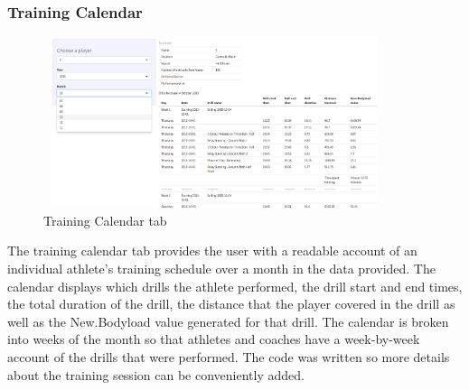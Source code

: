 \subsubsection{Training Calendar}
\begin{figure}
	\vspace{-2em}
	\includegraphics[height=5cm, width=10cm]{Images/TrainingCalendarTab.png}
	\caption{Training Calendar tab}
\end{figure}
The training calendar tab provides the user with a readable account of an individual athlete's training schedule over a month in the data provided. The calendar displays which drills the athlete performed, the drill start and end times, the total duration of the drill, the distance that the player covered in the drill as well as the New.Bodyload value generated for that drill. The calendar is broken into weeks of the month so that athletes and coaches have a week-by-week account of the drills that were performed. The code was written so more details about the training session can be conveniently added.


